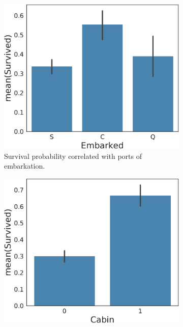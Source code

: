 \begin{figure}
    \centering
    \begin{subfigure}[b]{0.3\textwidth}
     \includegraphics[width=\textwidth]{media_saved/embarkation_survived}
     \caption{Survival probability correlated with ports of embarkation. \\}
     \label{fig:embarkationfeat}
    \end{subfigure}
    \quad
    \begin{subfigure}[b]{0.3\textwidth}
        \includegraphics[width=\textwidth]{media_saved/cabin_survived}

\end{subfigure}
\end{figure}
